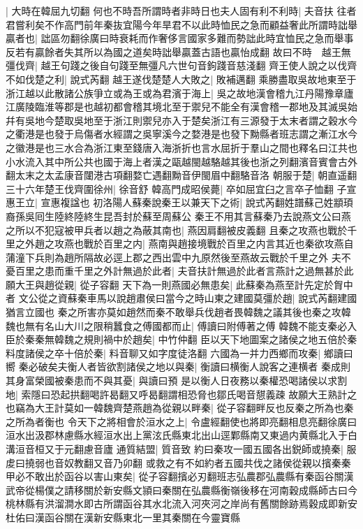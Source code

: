 |{
	大時在韓屈九切翻}
何也不時吾所謂時者非時日也夫人固有利不利時|{
	夫音扶}
往者君嘗利矣不作高門前年秦抜宜陽今年旱君不以此時恤民之急而顧益奢此所謂時詘舉贏者也|{
	詘區勿翻徐廣曰時衰耗而作奢侈言國家多難而勢詘此時宜恤民之急而舉事反若有贏餘者失其所以為國之道矣時詘舉贏蓋古語也贏怡成翻}
故曰不時　越王無彊伐齊|{
	越王句踐之後自句踐至無彊凡六世句音鉤踐音慈淺翻}
齊王使人說之以伐齊不如伐楚之利|{
	說式芮翻}
越王遂伐楚楚人大敗之|{
	敗補邁翻}
乘勝盡取吳故地東至于浙江越以此散諸公族爭立或為王或為君濱于海上|{
	吳之故地漢會稽九江丹陽豫章廬江廣陵臨淮等郡是也越初都會稽其境北至于禦兒不能全有漢會稽一郡地及其滅吳始幷有吳地今楚取吳地至于浙江則禦兒亦入于楚矣浙江有三源發于太末者謂之穀水今之衢港是也發于烏傷者水經謂之吳寧溪今之婺港是也發下黝縣者班志謂之漸江水今之徽港是也三水合為浙江東至錢唐入海浙折也言水屈折于羣山之間也釋名曰江共也小水流入其中所公共也國于海上者漢之甌越閩越駱越其後也浙之列翻濱音賓會古外翻太末之太孟康音闥港古項翻婺亡遇翻黝音伊閩眉中翻駱音洛}
朝服于楚|{
	朝直遥翻}
三十六年楚王伐齊圍徐州|{
	徐音舒}
韓高門成昭侯薨|{
	卒如屈宜臼之言卒子恤翻}
子宣惠王立|{
	宣惠複諡也}
初洛陽人蘇秦說秦王以兼天下之術|{
	說式芮翻姓譜蘇己姓顓頊裔孫吳囘生陸終陸終生昆吾封於蘇至周蘇公}
秦王不用其言蘇秦乃去說燕文公曰燕之所以不犯寇被甲兵者以趙之為蔽其南也|{
	燕因肩翻被皮義翻}
且秦之攻燕也戰於千里之外趙之攻燕也戰於百里之内|{
	燕南與趙接境戰於百里之内言其近也秦欲攻燕自蒲潼下兵則為趙所隔故必逕上郡之西出雲中九原然後至燕故云戰於千里之外}
夫不憂百里之患而重千里之外計無過於此者|{
	夫音扶計無過於此者言燕計之過無甚於此}
願大王與趙從親|{
	從子容翻}
天下為一則燕國必無患矣|{
	此蘇秦為燕至計先定於胷中者}
文公從之資蘇秦車馬以說趙肅侯曰當今之時山東之建國莫彊於趙|{
	說式芮翻建國猶言立國也}
秦之所害亦莫如趙然而秦不敢舉兵伐趙者畏韓魏之議其後也秦之攻韓魏也無有名山大川之限稍蠶食之傅國都而止|{
	傅讀曰附傅著之傅}
韓魏不能支秦必入臣於秦秦無韓魏之規則禍中於趙矣|{
	中竹仲翻}
臣以天下地圖案之諸侯之地五倍於秦料度諸侯之卒十倍於秦|{
	料音聊又如字度徒洛翻}
六國為一并力西鄉而攻秦|{
	鄉讀曰嚮}
秦必破矣夫衡人者皆欲割諸侯之地以與秦|{
	衡讀曰横衡人說客之連横者}
秦成則其身富榮國被秦患而不與其憂|{
	與讀曰預}
是以衡人日夜務以秦權恐喝諸侯以求割地|{
	索隱曰恐起拱翻喝許曷翻又呼曷翻謂相恐脅也鄒氏喝音憇義疎}
故願大王熟計之也竊為大王計莫如一韓魏齊楚燕趙為從親以畔秦|{
	從子容翻畔反也反秦之所為也秦之所為者衡也}
令天下之將相會於洹水之上|{
	令盧經翻使也將即亮翻相息亮翻徐廣曰洹水出汲郡林慮縣水經洹水出上黨泫氏縣東北出山逕鄴縣南又東過内黄縣北入于白溝洹音桓又于元翻慮音廬}
通質結盟|{
	質音致}
約曰秦攻一國五國各出鋭師或撓秦|{
	服䖍曰撓弱也音奴教翻又音乃卯翻}
或救之有不如約者五國共伐之諸侯從親以擯秦秦甲必不敢出於函谷以害山東矣|{
	從子容翻擯必刃翻班志弘農郡弘農縣有秦函谷關漢武帝從楊僕之請移關於新安縣文頴曰秦關在弘農縣衡嶺後移在河南穀成縣師古曰今桃林縣有洪溜澗水即古所謂函谷其水北流入河夾河之岸尚有舊關餘跡焉穀成即新安杜佑曰漢函谷關在漢新安縣東北一里其秦關在今靈寶縣}
